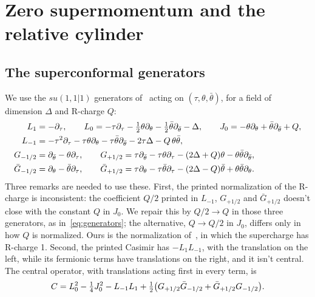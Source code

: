 \section{Zero supermomentum and the relative cylinder}
\label{sec:cylinder}

\subsection{The superconformal generators}

We use the $su(1,1|1)$ generators of~\cite[App.~A]{Bulycheva:2018qcp} acting on $(\tau,\theta,\bar\theta)$, for a field of dimension $\Delta$ and R-charge $Q$:
\begin{equation}\label{eq:generators}
\begin{aligned}
L_1&=-\partial_\tau,\qquad L_0=-\tau\partial_\tau-\tfrac12\theta\partial_\theta-\tfrac12\bar\theta\partial_{\bar\theta}-\Delta,\qquad J_0=-\theta\partial_\theta+\bar\theta\partial_{\bar\theta}+Q,\\
L_{-1}&=-\tau^2\partial_\tau-\tau\theta\partial_\theta-\tau\bar\theta\partial_{\bar\theta}-2\tau\Delta-Q\,\theta\bar\theta,\\
G_{-1/2}&=\partial_{\bar\theta}-\theta\partial_\tau,\qquad G_{+1/2}=\tau\partial_{\bar\theta}-\tau\theta\partial_\tau-(2\Delta+Q)\theta-\theta\bar\theta\partial_{\bar\theta},\\
\bar G_{-1/2}&=\partial_\theta-\bar\theta\partial_\tau,\qquad \bar G_{+1/2}=\tau\partial_\theta-\tau\bar\theta\partial_\tau-(2\Delta-Q)\bar\theta+\theta\bar\theta\partial_\theta.
\end{aligned}
\end{equation}
Three remarks are needed to use these. First, the printed normalization of the R-charge is inconsistent: the coefficient $Q/2$ printed in $L_{-1}$, $G_{+1/2}$ and $\bar G_{+1/2}$ doesn't close with the constant $Q$ in $J_0$. We repair this by $Q/2\to Q$ in those three generators, as in~\eqref{eq:generators}; the alternative, $Q\to Q/2$ in $J_0$, differs only in how $Q$ is normalized. Ours is the normalization of~\cite{Fu:2016vas}, in which the supercharge has R-charge 1. Second, the printed Casimir has $-L_1L_{-1}$, with the translation on the left, while its fermionic terms have translations on the right, and it isn't central. The central operator, with translations acting first in every term, is
\begin{equation}\label{eq:casimir}
C=L_0^2-\tfrac14J_0^2-L_{-1}L_1+\tfrac12\big(G_{+1/2}\bar G_{-1/2}+\bar G_{+1/2}G_{-1/2}\big).
\end{equation}
